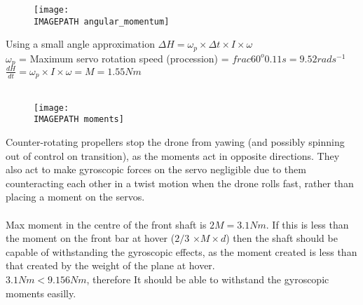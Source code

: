 \begin{figure}[!h]
	\texttt{[image: \\IMAGEPATH angular\_momentum]}
\end{figure}

Using a small angle approximation $\Delta H = \omega_p \times\Delta t \times I \times \omega$\\ 
$\omega_p$ = Maximum servo rotation speed (procession) = $frac{60^o}{0.11s} = 9.52rads^{-1}$\\
$\frac{dH}{dt} = \omega_p \times I \times \omega = M = 1.55Nm$\\\\

\begin{figure}[!h]
	\texttt{[image: \\IMAGEPATH moments]}
\end{figure}

 Counter-rotating propellers stop the drone from yawing (and possibly spinning out of control on transition), as the moments act in opposite directions. They also act to make gyroscopic forces on the servo negligible due to them counteracting each other in a twist motion when the drone rolls fast, rather than placing a moment on the servos.\\\\
Max moment in the centre of the front shaft is $2M = 3.1Nm$. If this is less than the moment on the front bar at hover ($2/3$ $\times M \times d$) then the shaft should be capable of withstanding the gyroscopic effects, as the moment created is less than that created by the weight of the plane at hover.\\

$3.1Nm < 9.156Nm$, therefore It should be able to withstand the gyroscopic moments easilly.

